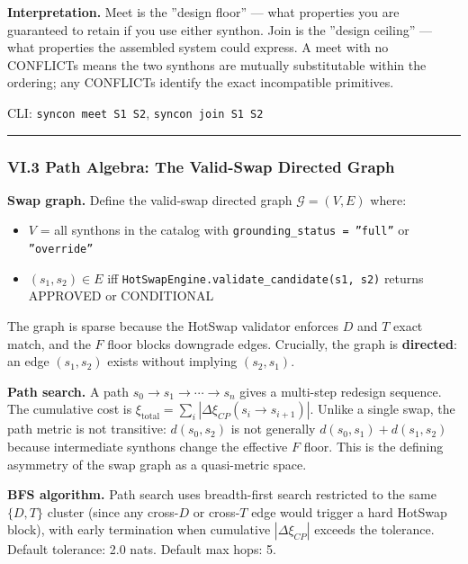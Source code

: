 \documentclass[12pt,a4paper]{article}
\begin{document}
\textbf{Interpretation.} Meet is the ''design floor'' --- what properties you are guaranteed to retain if you use either synthon. Join is the ''design ceiling'' --- what properties the assembled system could express. A meet with no CONFLICTs means the two synthons are mutually substitutable within the ordering; any CONFLICTs identify the exact incompatible primitives.

CLI: \texttt{syncon meet S1 S2}, \texttt{syncon join S1 S2}

\begin{center}
\rule{0.5\textwidth}{0.4pt}
\end{center}

\subsubsection{VI.3 Path Algebra: The Valid-Swap Directed Graph}

\textbf{Swap graph.} Define the valid-swap directed graph $\mathcal{G} = (V, E)$ where:

\begin{itemize}
    \item $V$ = all synthons in the catalog with \texttt{grounding\_status = ''full''} or \texttt{''override''}
    \item $(s_1, s_2) \in E$ iff \texttt{HotSwapEngine.validate\_candidate(s1, s2)} returns APPROVED or CONDITIONAL
\end{itemize}

The graph is sparse because the HotSwap validator enforces $D$ and $T$ exact match, and the $F$ floor blocks downgrade edges. Crucially, the graph is \textbf{directed}: an edge $(s_1, s_2)$ exists without implying $(s_2, s_1)$.

\textbf{Path search.} A path $s_0 \to s_1 \to \cdots \to s_n$ gives a multi-step redesign sequence. The cumulative cost is $\xi_{\text{total}} = \sum_i |\Delta\xi_{CP}(s_i \to s_{i+1})|$. Unlike a single swap, the path metric is not transitive: $d(s_0, s_2)$ is not generally $d(s_0, s_1) + d(s_1, s_2)$ because intermediate synthons change the effective $F$ floor. This is the defining asymmetry of the swap graph as a quasi-metric space.

\textbf{BFS algorithm.} Path search uses breadth-first search restricted to the same $\{D, T\}$ cluster (since any cross-$D$ or cross-$T$ edge would trigger a hard HotSwap block), with early termination when cumulative $|\Delta\xi_{CP}|$ exceeds the tolerance. Default tolerance: 2.0 nats. Default max hops: 5.
\end{document}

